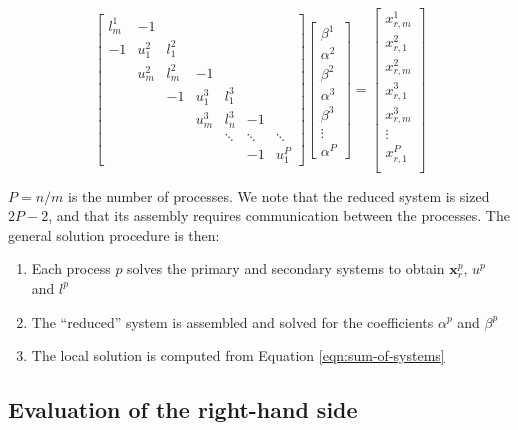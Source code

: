 \documentclass{elsarticle}
\begin{document}
\begin{equation} \label{eqn:reduced-system}
\begin{bmatrix}
l^1_m & -1 \\
-1    & u^2_1 & l^2_1 \\
      & u^2_m & l^2_m & -1 \\
      &       & -1    & u^3_1 & l^3_1 \\
      &       &       & u^3_m & l^3_n  & -1 \\
      &       &       &       & \ddots & \ddots & \ddots \\
      &       &       &       &        & -1     & u^P_1
\end{bmatrix}
\begin{bmatrix}
\beta^1 \\
\alpha^2 \\
\beta^2 \\
\alpha^3 \\
\beta^3 \\
\vdots \\
\alpha^P
\end{bmatrix}
=
\begin{bmatrix}
x_{r,m}^1 \\
x_{r,1}^2 \\
x_{r,m}^2 \\
x_{r,1}^3 \\
x_{r,m}^3 \\
\vdots \\
x_{r,1}^P \\
\end{bmatrix}
\end{equation}

$P = n/m$ is the number of processes.
We note that the reduced system is sized $2P-2$,
and that its assembly requires communication between the processes.
The general solution procedure is then:

\begin{enumerate}
    \item Each process $p$ solves the primary and secondary systems
        to obtain $\boldsymbol{x}_r^p$, $u^p$ and $l^p$
    \item The ``reduced'' system is assembled and solved for
        the coefficients $\alpha^p$ and $\beta^p$
    \item The local solution is computed from Equation \ref{eqn:sum-of-systems}
\end{enumerate}

\subsection{Evaluation of the right-hand side}
\end{document}
